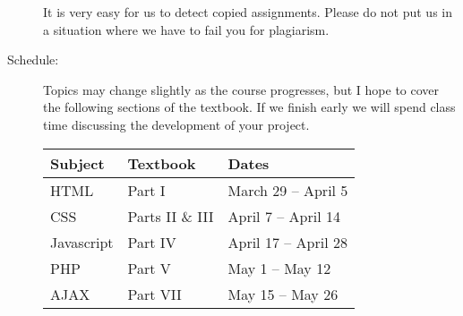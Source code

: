 \documentclass{article}
\begin{document}
\begin{description}
  It is very easy for us to detect copied assignments.  Please do not
  put us in a situation where we have to fail you for plagiarism.

\item[Schedule:] Topics may change slightly as the course progresses,
  but I hope to cover the following sections of the textbook.  If we
  finish early we will spend class time discussing the development of
  your project.
  
  \begin{tabular}{|l|l|l|}\hline
    Subject & Textbook & Dates \\\hline
HTML & Part I & March 29 -- April 5 \\\hline
 CSS & Parts II \& III & April 7 -- April 14 \\\hline
 Javascript & Part IV & April 17 -- April 28 \\\hline
 PHP & Part V & May 1 -- May 12 \\\hline
 AJAX & Part VII & May 15 -- May 26 \\\hline
\end{tabular}
\end{description}
\end{document}
